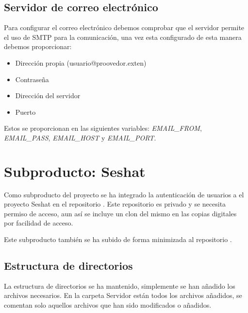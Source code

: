 \subsection{Servidor de correo electrónico}

Para configurar el correo electrónico debemos comprobar que el servidor permite el uso de SMTP para la comunicación, una vez esta configurado de esta manera debemos proporcionar:

\begin{itemize}
\setlength{\itemsep}{1pt}
\setlength{\parskip}{0pt}
\setlength{\parsep}{0pt}
\item Dirección propia (usuario@proovedor.exten)
\item Contraseña
\item Dirección del servidor
\item Puerto
\end{itemize}

Estos se proporcionan en las siguientes variables: \textit{EMAIL\_FROM}, \textit{EMAIL\_PASS}, \textit{EMAIL\_HOST} y \textit{EMAIL\_PORT}.




\section{Subproducto: Seshat}

Como subproducto del proyecto se ha integrado la autenticación de usuarios a el proyecto Seshat en el repositorio . Este repositorio es privado y se necesita permiso de acceso, aun así se incluye un clon del mismo en las copias digitales por facilidad de acceso.

Este subproducto también se ha subido de forma minimizada al repositorio . 

\subsection{Estructura de directorios}
La estructura de directorios se ha mantenido, simplemente se han añadido los archivos necesarios. En la carpeta Servidor están todos los archivos añadidos, se comentan solo aquellos archivos que han sido modificados o añadidos.


